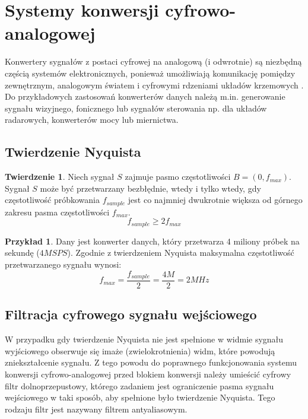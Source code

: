 \documentclass[10pt,a4paper,twoside]{report}
\theoremstyle{definition}
\theoremstyle{definition}
\theoremstyle{definition}
\newtheorem{przyklad}{Przykład}[section]
\theoremstyle{definition}
\newtheorem{twierdzenie}{Twierdzenie}[section]
\theoremstyle{definition}
\begin{document}
	\section{Systemy konwersji cyfrowo-analogowej}
	{	Konwertery sygnałów z postaci cyfrowej na analogową (i odwrotnie) są niezbędną częścią systemów elektronicznych, ponieważ umożliwiają komunikację pomiędzy zewnętrznym, analogowym światem i cyfrowymi rdzeniami układów krzemowych \cite{integconv}. Do przykładowych zastosowań konwerterów danych należą m.in. generowanie sygnału wizyjnego, fonicznego lub sygnałów sterowania np. dla układów radarowych, konwerterów mocy lub miernictwa. }
	
	\subsection{Twierdzenie Nyquista}
	
	\begin{twierdzenie}{Niech sygnał $S$ zajmuje pasmo częstotliwości $B =\left(0, f_{max}\right) $. Sygnał $S$ może być przetwarzany bezbłędnie, wtedy i tylko wtedy, gdy częstotliwość próbkowania $f_{sample}$ jest co najmniej dwukrotnie większa od górnego zakresu pasma częstotliwości $f_{max}$. }
	\begin{equation}
		f_{sample} \ge 2 f_{max}
	\end{equation}

	\end{twierdzenie}
	
	\begin{przyklad}{Dany jest konwerter danych, który przetwarza 4 miliony próbek na sekundę ($4MSPS$). Zgodnie z twierdzeniem Nyquista maksymalna częstotliwość przetwarzanego sygnału wynosi:}
		\begin{equation}
			f_{max} = \frac{f_{sample}}{2} = \frac{4M}{2} = 2MHz
		\end{equation}
	\end{przyklad}
	
	\subsection{Filtracja cyfrowego sygnału wejściowego}
	{	W przypadku gdy twierdzenie Nyquista nie jest spełnione w widmie sygnału wyjściowego obserwuje się imaże (zwielokrotnienia) widm, które powodują zniekształcenie sygnału. Z tego powodu do poprawnego funkcjonowania systemu konwersji cyfrowo-analogowej przed blokiem konwersji należy umieścić cyfrowy filtr dolnoprzepustowy, którego zadaniem jest ograniczenie pasma sygnału wejściowego w taki sposób, aby spełnione było twierdzenie Nyquista. Tego rodzaju filtr jest nazywany filtrem antyaliasowym. }
	
\end{document}
